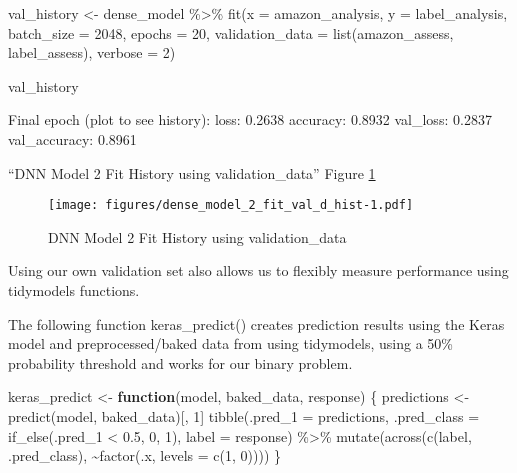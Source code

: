 \documentclass[
]{article}
\newenvironment{Shaded}{}{}
\newcommand{\AttributeTok}[1]{\textcolor[rgb]{0.49,0.56,0.16}{#1}}
\newcommand{\ControlFlowTok}[1]{\textcolor[rgb]{0.00,0.44,0.13}{\textbf{#1}}}
\newcommand{\DecValTok}[1]{\textcolor[rgb]{0.25,0.63,0.44}{#1}}
\newcommand{\FloatTok}[1]{\textcolor[rgb]{0.25,0.63,0.44}{#1}}
\newcommand{\FunctionTok}[1]{\textcolor[rgb]{0.02,0.16,0.49}{#1}}
\newcommand{\NormalTok}[1]{#1}
\newcommand{\OtherTok}[1]{\textcolor[rgb]{0.00,0.44,0.13}{#1}}
\newcommand{\SpecialCharTok}[1]{\textcolor[rgb]{0.25,0.44,0.63}{#1}}
\begin{document}
\begin{Shaded}
\begin{Highlighting}[]
\NormalTok{val\_history }\OtherTok{\textless{}{-}}\NormalTok{ dense\_model }\SpecialCharTok{\%\textgreater{}\%}
    \FunctionTok{fit}\NormalTok{(}\AttributeTok{x =}\NormalTok{ amazon\_analysis, }\AttributeTok{y =}\NormalTok{ label\_analysis, }\AttributeTok{batch\_size =} \DecValTok{2048}\NormalTok{, }\AttributeTok{epochs =} \DecValTok{20}\NormalTok{,}
        \AttributeTok{validation\_data =} \FunctionTok{list}\NormalTok{(amazon\_assess, label\_assess), }\AttributeTok{verbose =} \DecValTok{2}\NormalTok{)}

\NormalTok{val\_history}

\NormalTok{Final }\FunctionTok{epoch}\NormalTok{ (plot to see history)}\SpecialCharTok{:}
\NormalTok{        loss}\SpecialCharTok{:} \FloatTok{0.2638}
\NormalTok{    accuracy}\SpecialCharTok{:} \FloatTok{0.8932}
\NormalTok{    val\_loss}\SpecialCharTok{:} \FloatTok{0.2837}
\NormalTok{val\_accuracy}\SpecialCharTok{:} \FloatTok{0.8961} 
\end{Highlighting}
\end{Shaded}

``DNN Model 2 Fit History using validation\_data'' Figure
\ref{fig:model_11}

\begin{figure}
\centering
\texttt{[image: figures/dense\_model\_2\_fit\_val\_d\_hist-1.pdf]}
\caption{DNN Model 2 Fit History using
validation\_data\label{fig:model_11}}
\end{figure}

Using our own validation set also allows us to flexibly measure
performance using tidymodels functions.

The following function keras\_predict() creates prediction results using
the Keras model and preprocessed/baked data from using tidymodels, using
a 50\% probability threshold and works for our binary problem.

\begin{Shaded}
\begin{Highlighting}[]
\NormalTok{keras\_predict }\OtherTok{\textless{}{-}} \ControlFlowTok{function}\NormalTok{(model, baked\_data, response) \{}
\NormalTok{    predictions }\OtherTok{\textless{}{-}} \FunctionTok{predict}\NormalTok{(model, baked\_data)[, }\DecValTok{1}\NormalTok{]}
    \FunctionTok{tibble}\NormalTok{(}\AttributeTok{.pred\_1 =}\NormalTok{ predictions, }\AttributeTok{.pred\_class =} \FunctionTok{if\_else}\NormalTok{(.pred\_1 }\SpecialCharTok{\textless{}} \FloatTok{0.5}\NormalTok{, }\DecValTok{0}\NormalTok{, }\DecValTok{1}\NormalTok{), }\AttributeTok{label =}\NormalTok{ response) }\SpecialCharTok{\%\textgreater{}\%}
        \FunctionTok{mutate}\NormalTok{(}\FunctionTok{across}\NormalTok{(}\FunctionTok{c}\NormalTok{(label, .pred\_class), }\SpecialCharTok{\textasciitilde{}}\FunctionTok{factor}\NormalTok{(.x, }\AttributeTok{levels =} \FunctionTok{c}\NormalTok{(}\DecValTok{1}\NormalTok{, }\DecValTok{0}\NormalTok{))))}
\NormalTok{\}}
\end{Highlighting}
\end{Shaded}
\end{document}
